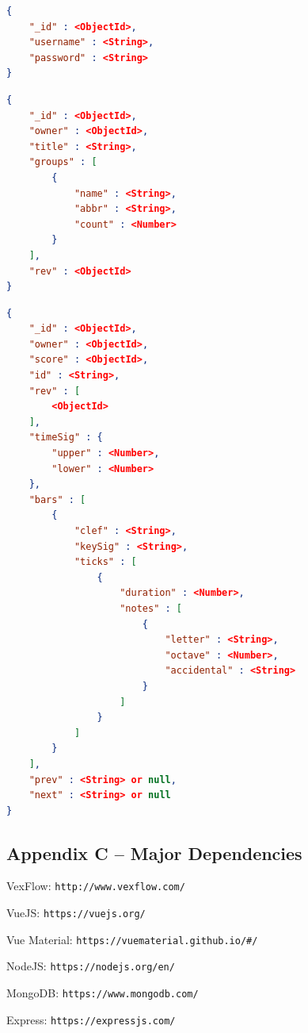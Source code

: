 \documentclass[letterpaper,12pt]{article}
\begin{document}
\begin{lstlisting}[language=json, caption=users]
{
    "_id" : <ObjectId>,
    "username" : <String>,
    "password" : <String>
}
\end{lstlisting}

\begin{lstlisting}[language=json, caption=musicScores]
{
    "_id" : <ObjectId>,
    "owner" : <ObjectId>,
    "title" : <String>,
    "groups" : [
        {
            "name" : <String>,
            "abbr" : <String>,
            "count" : <Number>
        }
    ],
    "rev" : <ObjectId>
}
\end{lstlisting}

\begin{lstlisting}[language=json, caption=measures]
{
    "_id" : <ObjectId>,
    "owner" : <ObjectId>,
    "score" : <ObjectId>,
    "id" : <String>,
    "rev" : [
        <ObjectId>
    ],
    "timeSig" : {
        "upper" : <Number>,
        "lower" : <Number>
    },
    "bars" : [
        {
            "clef" : <String>,
            "keySig" : <String>,
            "ticks" : [
                {
                    "duration" : <Number>,
                    "notes" : [
                        {
                            "letter" : <String>,
                            "octave" : <Number>,
                            "accidental" : <String>
                        }
                    ]
                }
            ]
        }
    ],
    "prev" : <String> or null,
    "next" : <String> or null
}
\end{lstlisting}

\newpage

\subsection{Appendix C -- Major Dependencies}

\noindent VexFlow: \lstinline{http://www.vexflow.com/}

\noindent VueJS: \lstinline{https://vuejs.org/}

\noindent Vue Material: \lstinline{https://vuematerial.github.io/#/}

\noindent NodeJS: \lstinline{https://nodejs.org/en/}

\noindent MongoDB: \lstinline{https://www.mongodb.com/}

\noindent Express: \lstinline{https://expressjs.com/}
\end{document}
